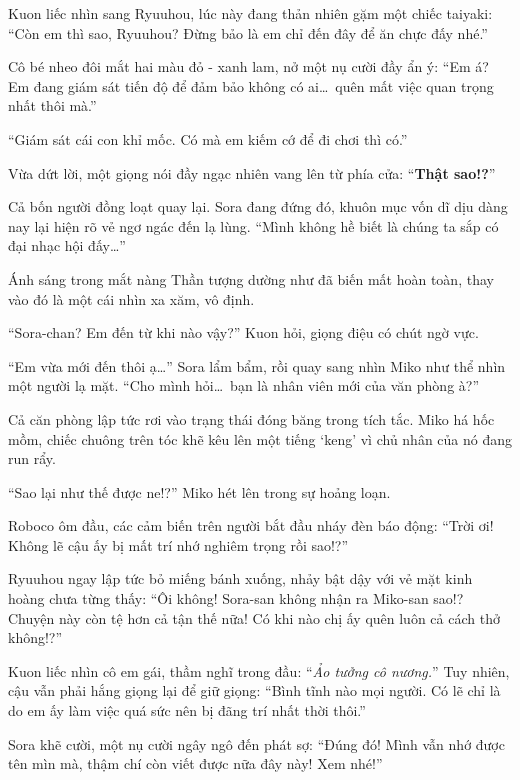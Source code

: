 \documentclass[../main.tex]{subfiles}
\begin{document}
Kuon liếc nhìn sang Ryuuhou, lúc này đang thản nhiên gặm một chiếc taiyaki: ``Còn em thì sao, Ryuuhou? Đừng bảo là em chỉ đến đây để ăn chực đấy nhé.''

Cô bé nheo đôi mắt hai màu đỏ - xanh lam, nở một nụ cười đầy ẩn ý: ``Em á? Em đang giám sát tiến độ để đảm bảo không có ai\dots\ quên mất việc quan trọng nhất thôi mà.''

``Giám sát cái con khỉ mốc. Có mà em kiếm cớ để đi chơi thì có.''

Vừa dứt lời, một giọng nói đầy ngạc nhiên vang lên từ phía cửa: ``\textbf{Thật sao!?}''

Cả bốn người đồng loạt quay lại.  Sora đang đứng đó, khuôn mục vốn dĩ dịu dàng nay lại hiện rõ vẻ ngơ ngác đến lạ lùng. ``Mình không hề biết là chúng ta sắp có đại nhạc hội đấy\dots''

Ánh sáng trong mắt nàng Thần tượng dường như đã biến mất hoàn toàn, thay vào đó là một cái nhìn xa xăm, vô định.


``Sora-chan? Em đến từ khi nào vậy?'' Kuon hỏi, giọng điệu có chút ngờ vực.

``Em vừa mới đến thôi ạ\dots'' Sora lẩm bẩm, rồi quay sang nhìn Miko như thể nhìn một người lạ mặt. ``Cho mình hỏi\dots\ bạn là nhân viên mới của văn phòng à?''

Cả căn phòng lập tức rơi vào trạng thái đóng băng trong tích tắc. Miko há hốc mồm, chiếc chuông trên tóc khẽ kêu lên một tiếng `keng' vì chủ nhân của nó đang run rẩy.

``Sao lại như thế được ne!?'' Miko hét lên trong sự hoảng loạn.

Roboco ôm đầu, các cảm biến trên người bắt đầu nháy đèn báo động: ``Trời ơi! Không lẽ cậu ấy bị mất trí nhớ nghiêm trọng rồi sao!?''

Ryuuhou ngay lập tức bỏ miếng bánh xuống, nhảy bật dậy với vẻ mặt kinh hoàng chưa từng thấy: ``Ôi không! Sora-san không nhận ra Miko-san sao!? Chuyện này còn tệ hơn cả tận thế nữa! Có khi nào chị ấy quên luôn cả cách thở không!?''

Kuon liếc nhìn cô em gái, thầm nghĩ trong đầu: ``\textit{Ảo tưởng cô nương.}'' Tuy nhiên, cậu vẫn phải hắng giọng lại để giữ giọng: ``Bình tĩnh nào mọi người. Có lẽ chỉ là do em ấy làm việc quá sức nên bị đãng trí nhất thời thôi.''

Sora khẽ cười, một nụ cười ngây ngô đến phát sợ: ``Đúng đó! Mình vẫn nhớ được tên mìn mà, thậm chí còn viết được nữa đây này! Xem nhé!''
\end{document}
